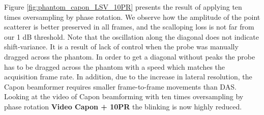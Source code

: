 \documentclass[journal]{IEEEtran}
\newcommand\multimedia[1]{\textbf{{\color{red}#1}}}
\begin{document}
Figure \ref{fig:phantom_capon_LSV_10PR} presents the result of applying ten times oversampling by phase rotation. We observe how the amplitude of the point scatterer is better preserved in all frames, and the scalloping loss is not far from our 1 dB threshold. Note that the oscillation along the diagonal does not indicate shift-variance. It is a result of lack of control when the probe was manually dragged across the phantom. In order to get a diagonal without peaks the probe has to be dragged across the phantom with a speed which matches the acquisition frame rate. In addition, due to the increase in lateral resolution, the Capon beamformer requires smaller frame-to-frame movements than DAS. Looking at the video of Capon beamforming with ten times oversampling by phase rotation \multimedia{Video Capon + 10PR} the blinking is now highly reduced. %



\end{document}
